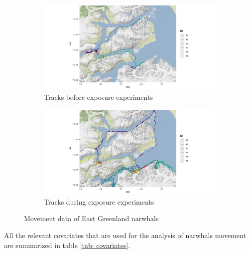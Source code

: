 \documentclass[11pt]{article}
\newcommand {\1}{\mathbb{1}}
\theoremstyle{definition}
\theoremstyle{remark}
\theoremstyle{remark}
\begin{document}
\begin{figure}[H]
	\centering
	\begin{subfigure}{0.49\textwidth}
		\centering
		\includegraphics[scale=0.38]{images/data_exploration/tracksBE1.png}
		\caption{Tracks before exposure experiments}
	\end{subfigure}
	\begin{subfigure}{0.49\textwidth}
		\centering
		\includegraphics[scale=0.38]{images/data_exploration/tracksAE.png}
		\caption{Tracks during exposure experiments}
	\end{subfigure}
	\caption{Movement data of East Greenland narwhals}
	\label{fig: tracks before and after exposure}
\end{figure}

 All the relevant covariates that are used for the analysis of narwhals movement are summarized in table \ref{tab: covariates}.
\end{document}
